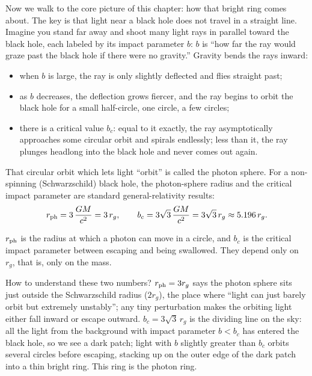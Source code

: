 Now we walk to the core picture of this chapter: how that bright ring comes about. The key is that light near a black hole does not travel in a straight line. Imagine you stand far away and shoot many light rays in parallel toward the black hole, each labeled by its impact parameter \(b\): \(b\) is ``how far the ray would graze past the black hole if there were no gravity.'' Gravity bends the rays inward:
\begin{itemize}
\item when \(b\) is large, the ray is only slightly deflected and flies straight past;
\item as \(b\) decreases, the deflection grows fiercer, and the ray begins to orbit the black hole for a small half-circle, one circle, a few circles;
\item there is a critical value \(b_c\): equal to it exactly, the ray asymptotically approaches some circular orbit and spirals endlessly; less than it, the ray plunges headlong into the black hole and never comes out again.
\end{itemize}
That circular orbit which lets light ``orbit'' is called the photon sphere. For a non-spinning (Schwarzschild) black hole, the photon-sphere radius and the critical impact parameter are standard general-relativity results:
\begin{equation}
  r_{\rm ph}=3\,\frac{GM}{c^2}=3\,r_g,\qquad
  b_c=3\sqrt{3}\,\frac{GM}{c^2}=3\sqrt{3}\,r_g\approx5.196\,r_g.
  \label{eq:e19-photonsphere}
\end{equation}
\begin{formulaexplain}
\(r_{\rm ph}\) is the radius at which a photon can move in a circle, and \(b_c\) is the critical impact parameter between escaping and being swallowed. They depend only on \(r_g\), that is, only on the mass.
\end{formulaexplain}
How to understand these two numbers? \(r_{\rm ph}=3r_g\) says the photon sphere sits just outside the Schwarzschild radius (\(2r_g\)), the place where ``light can just barely orbit but extremely unstably''; any tiny perturbation makes the orbiting light either fall inward or escape outward. \(b_c=3\sqrt3\,r_g\) is the dividing line on the sky: all the light from the background with impact parameter \(b<b_c\) has entered the black hole, so we see a dark patch; light with \(b\) slightly greater than \(b_c\) orbits several circles before escaping, stacking up on the outer edge of the dark patch into a thin bright ring. This ring is the photon ring.

